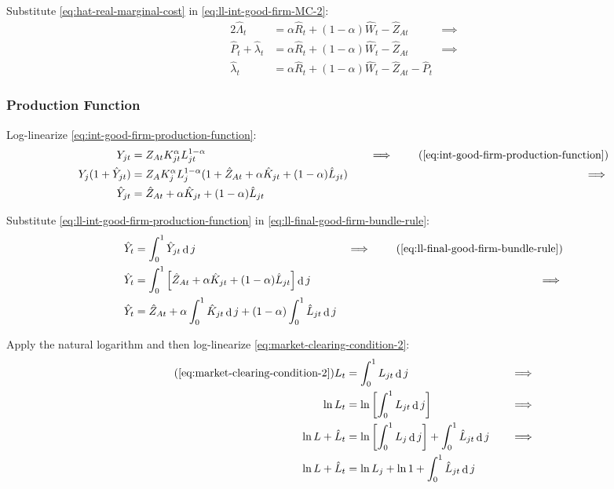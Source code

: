 \documentclass[
	12pt, 
	]{article}
\numberwithin{equation}{section}
\DeclareMathOperator{\dif}{d}
\theoremstyle{definition}
\theoremstyle{plain}
\theoremstyle{plain}
\theoremstyle{plain}
\begin{document}
Substitute \ref{eq:hat-real-marginal-cost} in \ref{eq:ll-int-good-firm-MC-2}:
\begin{alignat}{2}
	\hat{\Lambda}_t &= \alpha \hat{R}_t + (1- \alpha) \hat{W}_t - \hat{Z}_{At} &\implies \nonumber \\
	\hat{P}_t + \hat{\lambda}_t &= \alpha \hat{R}_t + (1- \alpha) \hat{W}_t - \hat{Z}_{At} &\implies \nonumber \\
	\hat{\lambda}_t &= \alpha \hat{R}_t + (1- \alpha) \hat{W}_t - \hat{Z}_{At} - \hat{P}_t \label{eq:ll-int-good-firm-MC-3}
\end{alignat}


\subsubsection{Production Function}

Log-linearize \ref{eq:int-good-firm-production-function}:
\begin{alignat}{2}
	Y_{jt} &= Z_{At} K_{jt}^\alpha L_{jt}^{1-\alpha} &\implies \tag{\ref{eq:int-good-firm-production-function}} \\
	Y_{j} (1+ \hat{Y}_{jt}) &= Z_{A} K_{j}^\alpha L_{j}^{1-\alpha} (1+ \hat{Z}_{At} + \alpha \hat{K}_{jt} + (1-\alpha) \hat{L}_{jt}) \quad &\implies \nonumber \\
	\hat{Y}_{jt} &= \hat{Z}_{At} + \alpha \hat{K}_{jt} + (1-\alpha) \hat{L}_{jt} \label{eq:ll-int-good-firm-production-function}
\end{alignat}

Substitute \ref{eq:ll-int-good-firm-production-function} in \ref{eq:ll-final-good-firm-bundle-rule}:
\begin{alignat}{2}
	\hat{Y}_t &= \int_{0}^{1} \hat{Y}_{jt} \dif j &\implies \tag{\ref{eq:ll-final-good-firm-bundle-rule}} \\
	\hat{Y}_t &= \int_{0}^{1} \left[ \hat{Z}_{At} + \alpha \hat{K}_{jt} + (1-\alpha) \hat{L}_{jt} \right] \dif j &\implies \nonumber \\
	\hat{Y}_t &= \hat{Z}_{At} + \alpha \int_{0}^{1} \hat{K}_{jt} \dif j + (1-\alpha) \int_{0}^{1} \hat{L}_{jt} \dif j \label{eq:ll-final-good-firm-bundle-rule-2}
\end{alignat}

Apply the natural logarithm and then log-linearize \ref{eq:market-clearing-condition-2}:
\begin{alignat}{2}
	\tag{\ref{eq:market-clearing-condition-2}}
	L_t &= \int_{0}^{1} L_{jt} \dif j &\implies \\
	\ln L_t &= \ln \left[ \int_{0}^{1} L_{jt} \dif j \right] &\implies \nonumber \\
	\ln L + \hat{L}_t &= \ln \left[ \int_{0}^{1} L_{j} \dif j \right] + \int_{0}^{1} \hat{L}_{jt} \dif j \quad &\implies \nonumber \\
	\ln L + \hat{L}_t &= \ln L_{j} + \ln 1 + \int_{0}^{1} \hat{L}_{jt} \dif j \nonumber
\end{alignat}
\end{document}
